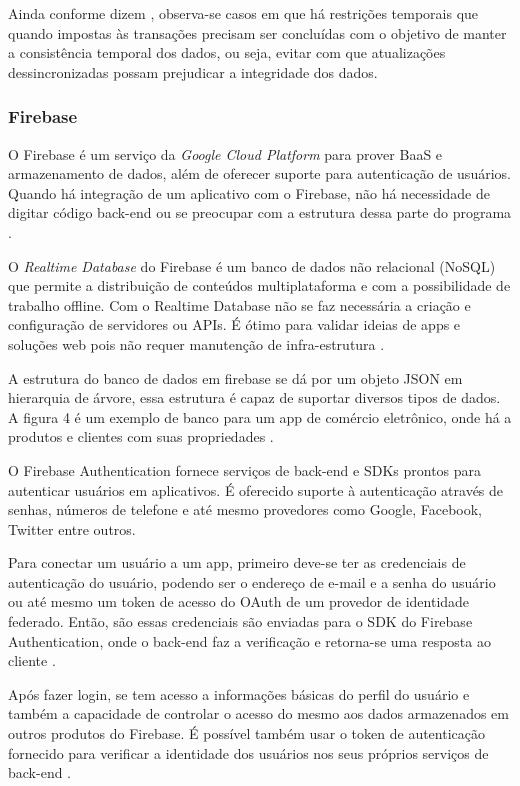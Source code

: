 Ainda conforme dizem \cite{mod_sgbdtr}, observa-se casos em que há restrições temporais que quando impostas às transações precisam ser concluídas com o objetivo de manter a consistência temporal dos dados, ou seja, evitar com que atualizações dessincronizadas possam prejudicar a integridade dos dados. 

\subsubsection{Firebase}
O Firebase é um serviço da \textit{Google Cloud Platform} para prover BaaS e armazenamento de dados, além de oferecer suporte para autenticação de usuários. Quando há integração de um aplicativo com o Firebase, não há necessidade de digitar código back-end ou se preocupar com a estrutura dessa parte do programa \citep{firebase_cheng}.

O \textit{Realtime Database}  do Firebase é um banco de dados não relacional (NoSQL) que permite a distribuição de conteúdos multiplataforma  e com a possibilidade de trabalho offline. Com o Realtime Database não se faz necessária a criação e configuração de servidores ou APIs. É ótimo para validar ideias de apps e soluções web pois não requer manutenção de infra-estrutura \citep{realtime_firebase}.

\pagebreak
A estrutura do banco de dados em firebase se dá por um objeto JSON em hierarquia de árvore, essa estrutura é capaz de suportar diversos tipos de dados. A figura 4 é um exemplo de banco para um app de comércio eletrônico, onde há a produtos e clientes com suas propriedades \citep{firebase_cheng}. 

O Firebase Authentication fornece serviços de back-end e SDKs prontos para autenticar usuários em aplicativos. É oferecido suporte à autenticação através de senhas, números de telefone e até mesmo provedores como Google, Facebook, Twitter entre outros.

Para conectar um usuário a um app, primeiro deve-se ter as credenciais de autenticação do usuário, podendo ser o endereço de e-mail e a senha do usuário ou até mesmo um token de acesso do OAuth de um provedor de identidade federado. Então, são essas credenciais são enviadas para o SDK do Firebase Authentication, onde o back-end faz a  verificação e retorna-se uma resposta ao cliente \citep{firebase_docs}.

Após fazer login, se tem acesso a informações básicas do perfil do usuário e também a capacidade de controlar o acesso do mesmo aos dados armazenados em outros produtos do Firebase. É possível também usar o token de autenticação fornecido para verificar a identidade dos usuários nos seus próprios serviços de back-end \citep{firebase_docs}.

